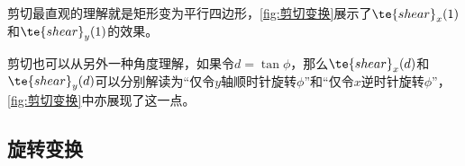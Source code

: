 剪切最直观的理解就是矩形变为平行四边形，\cref{fig:剪切变换}展示了$\te{shear}_x(1)$和$\te{shear}_y(1)$的效果。

\begin{Figure}[剪切变换]
\end{Figure}

剪切也可以从另外一种角度理解，如果令$d=\tan\phi$，那么$\te{shear}_x(d)$和$\te{shear}_y(d)$可以分别解读为“仅令$y$轴顺时针旋转$\phi$”和“仅令$x$逆时针旋转$\phi$”，\cref{fig:剪切变换}中亦展现了这一点。

\subsection{旋转变换}

